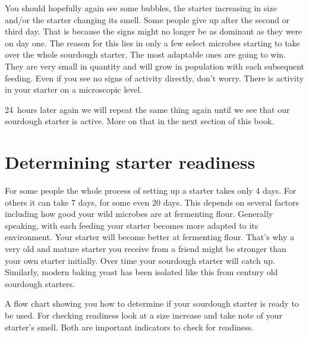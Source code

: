 You should hopefully again see some bubbles, the starter increasing
in size and/or the starter changing its smell. Some people give
up after the second or third day. That is because the signs might no longer
be as dominant as they were on day one. The reason for this lies in only a few
select microbes starting to take over the whole sourdough starter. The most
adaptable ones are going to win. They are very small in quantity and will
grow in population with each subsequent feeding. Even if you see no signs
of activity directly, don't worry. There is activity in
your starter on a microscopic level.

24~hours later again we will repeat the same thing again until
we see that our sourdough starter is active. More on that in the
next section of this book.

\section{Determining starter readiness}

For some people the whole process of setting up a starter takes
only 4 days. For others it can take 7 days, for some even 20 days.
This depends on several factors including how good your wild microbes
are at fermenting flour. Generally speaking, with each feeding
your starter becomes more adapted to its environment. Your
starter will become better at fermenting flour. That's why
a very old and mature starter you receive from a friend might
be stronger than your own starter initially. Over time
your sourdough starter will catch up. Similarly, modern baking
yeast has been isolated like this from century old sourdough
starters.

\begin{flowchart}[!htb]
\begin{center}
  
  \caption[Sourdough readiness flow chart]{A flow chart showing you how to
      determine if your sourdough starter is ready to be used.  For checking
      readiness look at a size increase and take note of your starter's smell.
      Both are important indicators to check for readiness.}%
  \label{fig:sourdough-starter-readiness}
\end{center}
\end{flowchart}

